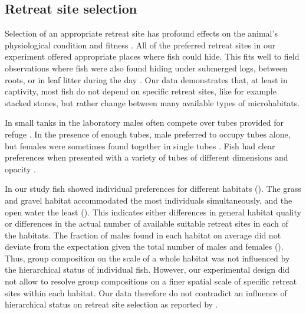 \subsection{Retreat site selection}
Selection of an appropriate retreat site has profound effects on the animal's physiological condition and fitness \citep{Rosenzweig1981, Huey1991}. All of the preferred retreat sites in our experiment offered appropriate places where fish could hide. This fits well to field observations where fish were also found hiding under submerged logs, between roots, or in leaf litter during the day \citep{Hopkins1974, Hagedorn1988, Westby1988}. Our data
demonstrates that, at least in captivity, most fish do not depend on specific retreat sites, like for example stacked stones, but rather change between many available types of microhabitats.

In small tanks in the laboratory males often compete over tubes provided for refuge \citep{Hopkins1974, Hagedorn1988, Fugere2011}. In the presence of enough tubes, male
\lepto{} preferred to occupy tubes alone, but females were sometimes found together in single tubes \citep{Dunlap2002}. Fish had clear preferences when presented with a variety of tubes of different dimensions and opacity \citep{Dunlap2002}.

In our study fish showed individual preferences for different habitats (). The grass and gravel habitat accommodated the most individuals simultaneously, and the open water the least (). This indicates either differences in general habitat quality or differences in the actual number of available suitable retreat sites in each of the habitats. The fraction of males found in each habitat on average did not deviate from the expectation given the total number of males and females (). Thus, group composition on the scale of a whole
habitat was not influenced by the hierarchical status of individual fish. However, our experimental design did not allow to resolve group compositions on a finer spatial scale of specific retreat sites within each habitat. Our data therefore do not contradict an influence of hierarchical status on retreat site selection as reported by \citet{Dunlap2002}.


